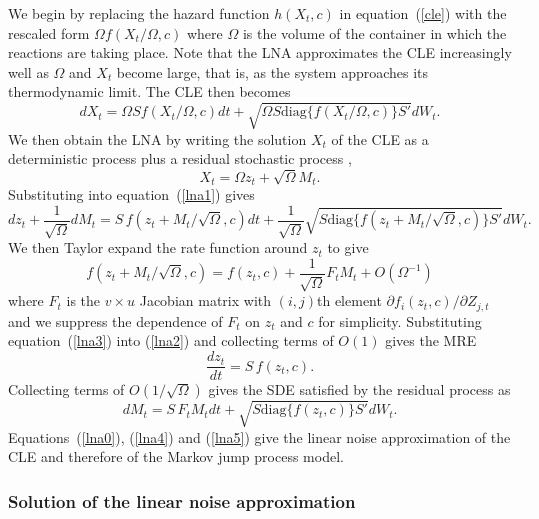 \documentclass[12pt, DIV12]{scrartcl}
\begin{document}
We begin by replacing the hazard function $h(X_t,c)$ in equation~(\ref{cle})
with the rescaled form $\Omega f(X_t /\Omega,c)$ where $\Omega$ is the volume of
the container in which the reactions are taking place. Note that the LNA
approximates the CLE increasingly well as $\Omega$ and $X_t$ become large, that
is, as the system approaches its thermodynamic limit. The CLE then becomes
\begin{equation}\label{lna1}
d X_t = \Omega S f(X_t /\Omega,c)dt + \sqrt{\Omega S\textrm{diag}\{f(X_t /\Omega,c)\}S'}dW_t.
\end{equation}
We then obtain the LNA by writing the solution $X_t$ of the CLE as a
deterministic process plus a residual stochastic process \citep{kampen2001},
\begin{equation}\label{lna0}
X_t = \Omega z_{t}+\sqrt{\Omega}M_{t}.
\end{equation}
Substituting into equation~(\ref{lna1}) gives
\begin{equation}\label{lna2}
  d z_{t}+\frac{1}{\sqrt{\Omega}}dM_{t} = S\, f(z_t+M_t /\sqrt{\Omega},c)dt + \frac{1}{\sqrt{\Omega}}\sqrt{S\textrm{diag}\{f(z_t+M_t /\sqrt{\Omega},c)\}S'}dW_t.
\end{equation}
We then Taylor expand the rate function around $z_t$ to give
\begin{equation}\label{lna3}
f(z_t+M_t /\sqrt{\Omega},c) = f(z_t,c)+\frac{1}{\sqrt{\Omega}}F_t M_t + O(\Omega^{-1})
\end{equation}
where $F_t$ is the $v\times u$ Jacobian matrix with $(i,j)$th element $\partial f_{i}(z_t,c) / \partial Z_{j,t}$ 
and we suppress the dependence of $F_t$ on $z_t$ and $c$ for simplicity. 
Substituting equation~(\ref{lna3}) into (\ref{lna2}) and collecting terms of 
$O(1)$ gives the MRE
\begin{equation}\label{lna4}
\frac{dz_{t}}{dt}=S\,f(z_{t},c).
\end{equation}
Collecting terms of $O(1/\sqrt{\Omega})$ gives the SDE satisfied by the residual process as
\begin{equation}\label{lna5}
dM_{t}=S\, F_t M_t dt + \sqrt{S\textrm{diag}\{f(z_t,c)\}S'}dW_t .
\end{equation}
Equations~(\ref{lna0}), (\ref{lna4}) and (\ref{lna5}) give the linear noise
approximation of the CLE and therefore of the Markov jump process model.


\subsubsection{Solution of the linear noise approximation}
\end{document}
